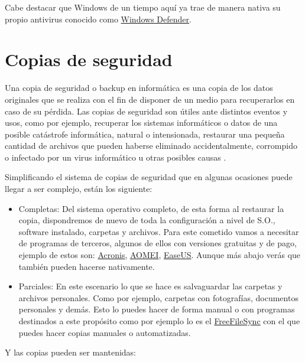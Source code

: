 \documentclass[
  spanish,
  a4paper,
  openany]{book}
\begin{document}
Cabe destacar que Windows de un tiempo aquí ya trae de manera nativa su propio antivirus conocido como \href{https://www.microsoft.com/es-es/windows/comprehensive-security}{Windows Defender}.

\hypertarget{copias-de-seguridad}{%
\section{Copias de seguridad}\label{copias-de-seguridad}}

Una copia de seguridad o backup en informática es una copia de los datos originales que se realiza con el fin de disponer de un medio para recuperarlos en caso de su pérdida. Las copias de seguridad son útiles ante distintos eventos y usos, como por ejemplo, recuperar los sistemas informáticos o datos de una posible catástrofe informática, natural o intensionada, restaurar una pequeña cantidad de archivos que pueden haberse eliminado accidentalmente, corrompido o infectado por un virus informático u otras posibles causas \citep{WIKI-copias-seguridad}.

Simplificando el sistema de copias de seguridad que en algunas ocasiones puede llegar a ser complejo, están los siguiente:

\begin{itemize}
\item
  Completas: Del sistema operativo completo, de esta forma al restaurar la copia, dispondremos de nuevo de toda la configuración a nivel de S.O., software instalado, carpetas y archivos. Para este cometido vamos a necesitar de programas de terceros, algunos de ellos con versiones gratuitas y de pago, ejemplo de estos son: \href{https://www.acronis.com/}{Acronis}, \href{https://www.aomeitech.com/}{AOMEI}, \href{https://www.easeus.com/}{EaseUS}. Aunque más abajo verás que también pueden hacerse nativamente.
\item
  Parciales: En este escenario lo que se hace es salvaguardar las carpetas y archivos personales. Como por ejemplo, carpetas con fotografías, documentos personales y demás. Esto lo puedes hacer de forma manual o con programas destinados a este propósito como por ejemplo lo es el \href{https://freefilesync.org/}{FreeFileSync} con el que puedes hacer copias manuales o automatizadas.
\end{itemize}

Y las copias pueden ser mantenidas:
\end{document}
